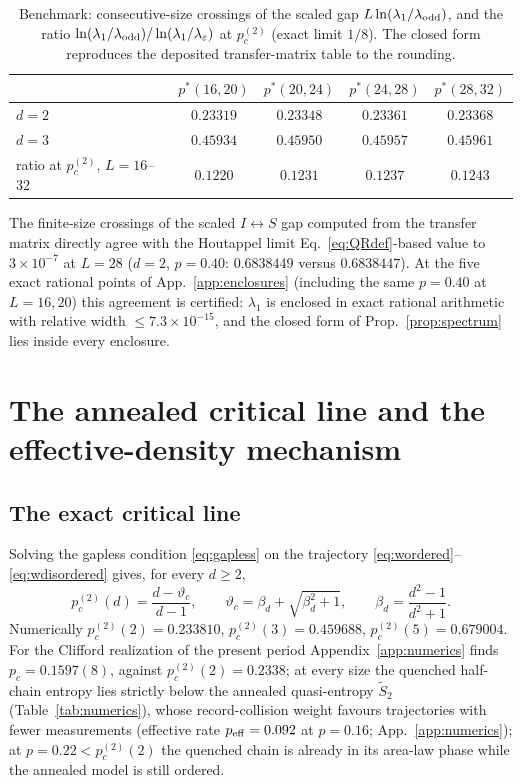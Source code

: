 \documentclass[11pt]{article}
\newcommand{\pctwo}{p_c^{(2)}}
\newcommand{\vth}{\vartheta}
\begin{document}
\begin{table}[t]
\centering
\begin{tabular}{lcccc}
\toprule
 & $p^*(16,20)$ & $p^*(20,24)$ & $p^*(24,28)$ & $p^*(28,32)$\\
\midrule
$d=2$ & $0.23319$ & $0.23348$ & $0.23361$ & $0.23368$\\
$d=3$ & $0.45934$ & $0.45950$ & $0.45957$ & $0.45961$\\
\midrule
ratio at $\pctwo$, $L=16$--$32$ & $0.1220$ & $0.1231$ & $0.1237$ & $0.1243$\\
\bottomrule
\end{tabular}
\caption{Benchmark: consecutive-size crossings of the scaled gap
$L\ln(\lambda_1/\lambda_{\rm odd})$, and the ratio
$\ln(\lambda_1/\lambda_{\rm odd})/\ln(\lambda_1/\lambda_\varepsilon)$ at
$\pctwo$ (exact limit $1/8$).  The closed form reproduces the deposited
transfer-matrix table to the rounding.}
\label{tab:benchmark}
\end{table}

The finite-size crossings of the scaled $I\leftrightarrow S$ gap computed
from the transfer matrix directly agree with the Houtappel limit
Eq.~\eqref{eq:QRdef}-based value to $3\times10^{-7}$ at $L=28$ ($d=2$,
$p=0.40$: $0.6838449$ versus $0.6838447$).  At the five exact rational
points of App.~\ref{app:enclosures} (including the same $p=0.40$ at
$L=16,20$) this agreement is certified: $\lambda_1$ is enclosed in exact
rational arithmetic with relative width $\le7.3\times10^{-15}$, and the
closed form of Prop.~\ref{prop:spectrum} lies inside every enclosure.

\section{The annealed critical line and the effective-density mechanism}
\label{sec:annealed}

\subsection{The exact critical line}
Solving the gapless condition \eqref{eq:gapless} on the trajectory
\eqref{eq:wordered}--\eqref{eq:wdisordered} gives, for every $d\ge2$,
\begin{equation}
  \boxed{\;\pctwo(d)=\frac{d-\vth_c}{d-1},\qquad
  \vth_c=\beta_d+\sqrt{\beta_d^2+1},\qquad \beta_d=\frac{d^2-1}{d^2+1}.\;}
  \label{eq:pctwo}
\end{equation}
Numerically $\pctwo(2)=0.233810$, $\pctwo(3)=0.459688$,
$\pctwo(5)=0.679004$.  For the Clifford realization of the present period
Appendix~\ref{app:numerics} finds $p_c=0.1597(8)$, against
$\pctwo(2)=0.2338$; at every size the quenched half-chain entropy lies
strictly below the annealed quasi-entropy $\tilde S_2$
(Table~\ref{tab:numerics}), whose record-collision weight favours
trajectories with fewer measurements (effective rate
$p_{\rm eff}=0.092$ at $p=0.16$; App.~\ref{app:numerics}); at
$p=0.22<\pctwo(2)$ the quenched chain is already in its area-law phase while
the annealed model is still ordered.
\end{document}
